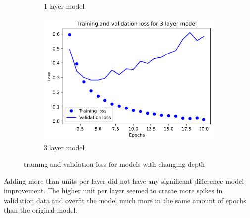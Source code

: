 \documentclass{article}
\begin{document}
\begin{figure}[H]
\begin{subfigure}{.5\textwidth}
            \caption{1 layer model}
            \label{fig1:sfig2}
        \end{subfigure}
        \begin{subfigure}{.5\textwidth}
            \centering
            \includegraphics[width=\linewidth]{images/movies/2.png}
            \caption{3 layer model}
            \label{fig1:sfig3}
        \end{subfigure}
        \caption{training and validation loss for models with changing depth}
        \label{fig1:fig}
    \end{figure}
    Adding more than units per layer did not have any significant difference model improvement. 
    The higher unit per layer seemed to create more spikes in validation data and overfit the 
    model much more in the same amount of epochs than the original model.
\end{document}

